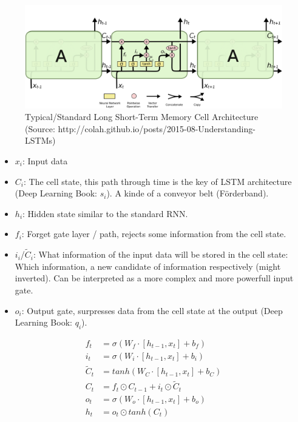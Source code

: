 \documentclass[ a4paper , 12pt ]{scrartcl}%
\begin{document}

 \newline 

\begin{figure}[h!]
	\centering
	\includegraphics[scale=1.0, angle=0, clip ,trim= 200 0 200 40]{images/lstm_architecture_mod}
	\caption{Typical/Standard Long Short-Term Memory Cell Architecture (Source: http://colah.github.io/posts/2015-08-Understanding-LSTMs)}
	\label{fig:LSTMCell}
\end{figure}

\begin{itemize}
  \item[] $x_i$: Input data
  \item[] $C_i$: The cell state, this path through time is the key of LSTM architecture (Deep Learning Book: $s_i$). A kinde of a conveyor belt (Förderband).
  \item[] $h_i$: Hidden state similar to the standard RNN.
  \item[] $f_i$: Forget gate layer / path, rejects some information from the cell state.
  \item[] $i_i$/$\widetilde{C}_i$: What information of the input data will be stored in the cell state: Which information, a new candidate of information respectively (might inverted). Can be interpreted as a more complex and more powerfull input gate.
  \item[] $o_i$: Output gate, surpresses data from the cell state at the output (Deep Learning Book: $q_i$).
\end{itemize}

\begin{align}
f_t &= \sigma(W_f \cdot [h_{t-1},x_t] + b_f) \\
i_t &= \sigma(W_i \cdot [h_{t-1},x_t] + b_i) \\
\widetilde{C}_{t} &= tanh(W_C \cdot [h_{t-1},x_t] + b_C) \\
C_t &=  f_t \odot  C_{t-1} + i_t \odot \widetilde{C}_t \\
o_t &= \sigma(W_o \cdot [h_{t-1},x_t] + b_o) \\
h_t &= o_t \odot tanh(C_t)
\end{align}
\end{document}
